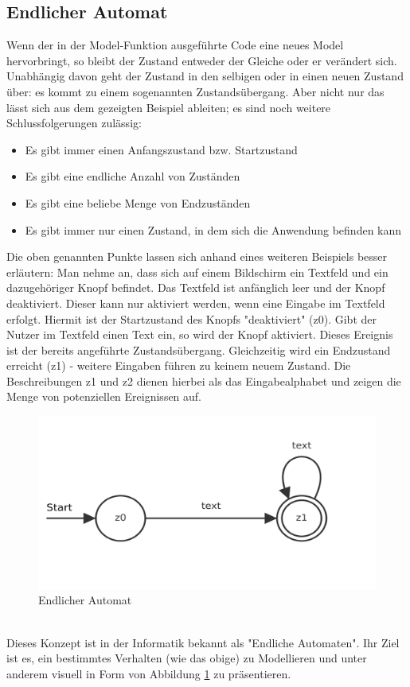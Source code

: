 \subsection{Endlicher Automat}
Wenn der in der Model-Funktion ausgeführte Code eine neues Model hervorbringt, so bleibt der Zustand entweder der Gleiche oder er verändert sich. Unabhängig davon geht der Zustand in den selbigen oder in einen neuen Zustand über: es kommt zu einem sogenannten Zustandsübergang. Aber nicht nur das lässt sich aus dem gezeigten Beispiel ableiten; es sind noch weitere Schlussfolgerungen zulässig:
\\
\begin{itemize}
	\item Es gibt immer einen Anfangszustand bzw. Startzustand
	\item Es gibt eine endliche Anzahl von Zuständen
	\item Es gibt eine beliebe Menge von Endzuständen
	\item Es gibt immer nur einen Zustand, in dem sich die Anwendung befinden kann
\end{itemize}
\bigskip
Die oben genannten Punkte lassen sich anhand eines weiteren Beispiels besser erläutern: Man nehme an, dass sich auf einem Bildschirm ein Textfeld und ein dazugehöriger Knopf befindet. Das Textfeld ist anfänglich leer und der Knopf deaktiviert. Dieser kann nur aktiviert werden, wenn eine Eingabe im Textfeld erfolgt. Hiermit ist der Startzustand des Knopfs "deaktiviert" (z0). Gibt der Nutzer im Textfeld einen Text ein, so wird der Knopf aktiviert. Dieses Ereignis ist der bereits angeführte Zustandsübergang.
Gleichzeitig wird ein Endzustand erreicht (z1) - weitere Eingaben führen zu keinem neuem Zustand.
Die Beschreibungen z1 und z2 dienen hierbei als das Eingabealphabet und zeigen die Menge von potenziellen Ereignissen auf.
\begin{figure}[ht]
	\centering
	\includegraphics[height=0.35\textwidth]{./images/out}
	\caption{Endlicher Automat}
	\label{fig:endlicherAutomat}
\end{figure}
\\
Dieses Konzept ist in der Informatik bekannt als "Endliche Automaten". Ihr Ziel ist es, ein bestimmtes Verhalten (wie das obige) zu Modellieren und unter anderem visuell in Form von Abbildung
\ref{fig:endlicherAutomat} 
zu präsentieren.